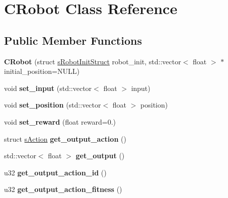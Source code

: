 \hypertarget{classCRobot}{\section{C\-Robot Class Reference}
\label{classCRobot}
}
\subsection*{Public Member Functions}
\begin{DoxyCompactItemize}
\item 
\hypertarget{classCRobot_a41a1f01a5a62f3787602f34ce19bbdb0}{{\bfseries C\-Robot} (struct \hyperlink{structsRobotInitStruct}{s\-Robot\-Init\-Struct} robot\-\_\-init, std\-::vector$<$ float $>$ $\ast$initial\-\_\-position=N\-U\-L\-L)}\label{classCRobot_a41a1f01a5a62f3787602f34ce19bbdb0}

\item 
\hypertarget{classCRobot_a351391fb936aee03386e86af1b023066}{void {\bfseries set\-\_\-input} (std\-::vector$<$ float $>$ input)}\label{classCRobot_a351391fb936aee03386e86af1b023066}

\item 
\hypertarget{classCRobot_a1857f6841d16ba10bf1cf4844c19598e}{void {\bfseries set\-\_\-position} (std\-::vector$<$ float $>$ position)}\label{classCRobot_a1857f6841d16ba10bf1cf4844c19598e}

\item 
\hypertarget{classCRobot_a38a3f39e4c38020623953e53444db628}{void {\bfseries set\-\_\-reward} (float reward=0.)}\label{classCRobot_a38a3f39e4c38020623953e53444db628}

\item 
\hypertarget{classCRobot_a21f7af13120907f47c4e5665e91a576e}{struct \hyperlink{structsAction}{s\-Action} {\bfseries get\-\_\-output\-\_\-action} ()}\label{classCRobot_a21f7af13120907f47c4e5665e91a576e}

\item 
\hypertarget{classCRobot_af3ae110c2cffbe7e81f4ea172db29322}{std\-::vector$<$ float $>$ {\bfseries get\-\_\-output} ()}\label{classCRobot_af3ae110c2cffbe7e81f4ea172db29322}

\item 
\hypertarget{classCRobot_a6b956550ea12140668160b0b579ee9c9}{u32 {\bfseries get\-\_\-output\-\_\-action\-\_\-id} ()}\label{classCRobot_a6b956550ea12140668160b0b579ee9c9}

\item 
\hypertarget{classCRobot_a567c257d3b1253d26bc5172c6c0ceae7}{u32 {\bfseries get\-\_\-output\-\_\-action\-\_\-fitness} ()}\label{classCRobot_a567c257d3b1253d26bc5172c6c0ceae7}


\end{DoxyCompactItemize}
